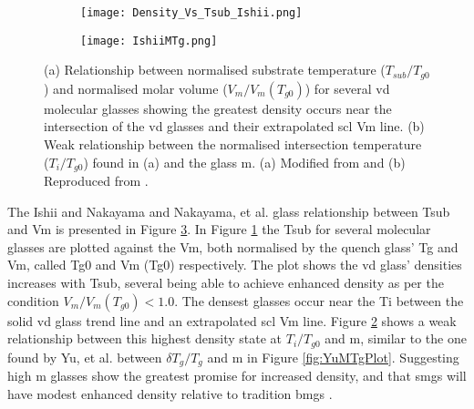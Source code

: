 \documentclass[a4paper,12pt,oneside]{report}%
\begin{document}
\begin{figure}[bp]
	\centering
	\begin{subfigure}[htbp]{0.75\textwidth}
		\texttt{[image: Density\_Vs\_Tsub\_Ishii.png]}
		\caption{}
		\label{fig:IshiiDensityTsub}
	\end{subfigure}
	\begin{subfigure}[htbp]{0.75\textwidth}
		\texttt{[image: IshiiMTg.png]}
		\caption{}
		\label{fig:IshiiMTg}
	\end{subfigure}
	\caption[(a) Relationship between normalised substrate temperature ($T_{sub}/T_{g0}$) and normalised molar volume ($V_{m}/V_{m} (T_{g0})$) for several \acrshort{vd} molecular glasses showing the greatest density occurs near the intersection of the \acrshort{vd} glasses and their extrapolated \acrshort{scl} \acrshort{Vm} line. (b) Weak relationship between the normalised intersection temperature ($T_{i}/T_{g0}$) found in (a) and the glass \acrfull{m}.]{(a) Relationship between normalised substrate temperature ($T_{sub}/T_{g0}$) and normalised molar volume ($V_{m}/V_{m} (T_{g0})$) for several \acrshort{vd} molecular glasses showing the greatest density occurs near the intersection of the \acrshort{vd} glasses and their extrapolated \acrshort{scl} \acrshort{Vm} line. (b) Weak relationship between the normalised intersection temperature ($T_{i}/T_{g0}$) found in (a) and the glass \acrfull{m}. (a) Modified from \cite{Ishii2014} and (b) Reproduced from \cite{Ishii2014}.}%
	\label{fig:IshiiTsubM}
\end{figure}


The Ishii and Nakayama \cite{Ishii2014} and Nakayama, et al. \cite{Nakayama2013} glass relationship between \gls{Tsub} and \gls{Vm} is presented in Figure \ref{fig:IshiiTsubM}. In Figure \ref{fig:IshiiDensityTsub} the \gls{Tsub} for several molecular glasses are plotted against the \gls{Vm}, both normalised by the quench glass' \gls{Tg} and \gls{Vm}, called \acrshort{Tg0} and \gls{Vm} (\acrshort{Tg0}) respectively. The plot shows the \gls{vd} glass' densities increases with \gls{Tsub}, several being able to achieve enhanced density as per the condition $V_{m}/V_{m} (T_{g0})<1.0$. The densest glasses occur near the \gls{Ti} between the solid \gls{vd} glass trend line and an extrapolated \gls{scl} \gls{Vm} line. Figure \ref{fig:IshiiMTg} shows a weak relationship between this highest density state at $T_{i}/T_{g0}$ and \gls{m}, similar to the one found by Yu, et al. \cite{Yu2013} between $\delta T_{g}/T_{g}$ and \gls{m} in Figure \ref{fig:YuMTgPlot}. Suggesting high \gls{m} glasses show the greatest promise for increased density, and that \glspl{smg} will have modest enhanced density relative to tradition \glspl{bmg} \cite{Ishii2014, Nakayama2013}. 
\end{document}
